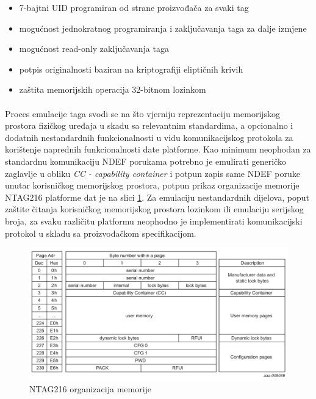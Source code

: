 \begin{itemize}[noitemsep]
    \item 7-bajtni UID programiran od strane proizvođača za svaki tag
    \item mogućnost jednokratnog programiranja i zaključavanja taga za dalje izmjene
    \item mogućnost read-only zaključavanja taga
    \item potpis originalnosti baziran na kriptografiji eliptičnih krivih
    \item zaštita memorijskih operacija 32-bitnom lozinkom
\end{itemize}

\paragraph*{}
Proces emulacije taga svodi se na što vjerniju reprezentaciju memorijskog prostora fizičkog uređaja u skadu sa relevantnim standardima, a opcionalno i dodatnih nestandardnih funkcionalnosti u vidu komunikacijskog protokola za korištenje naprednih funkcionalnosti date platforme. Kao minimum neophodan za standardnu komunikaciju NDEF porukama potrebno je emulirati generičko zaglavlje u obliku \textit{CC - capability container} i potpun zapis same NDEF poruke unutar korisničkog memorijskog prostora, potpun prikaz organizacije memorije NTAG216 platforme dat je na slici \ref{fig:ntag_mem}. Za emulaciju nestandardnih dijelova, poput zaštite čitanja korisničkog memorijskog prostora lozinkom ili emulaciju serijskog broja, za svaku različitu platformu neophodno je implementirati komunikacijski protokol u skladu sa proizvođačkom specifikacijom.

\begin{figure}[H]
    \centering
    \includegraphics[width=1\textwidth]{material/ntag216-memory}
    \caption{NTAG216 organizacija memorije\cite{NTAG216}}
    \label{fig:ntag_mem}
\end{figure}

